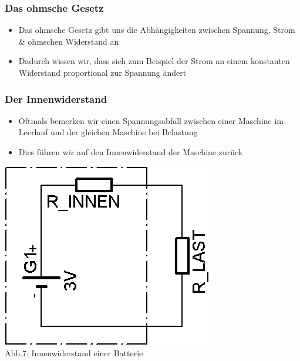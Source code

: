 \begin{frame}
  \frametitle{Das ohmsche Gesetz}
  \begin{itemize}
    \item	Das ohmsche Gesetz gibt uns die Abhängigkeiten zwischen Spannung, Strom \& ohmschen Widerstand an
    \item	Dadurch wissen wir, dass sich zum Beispiel der Strom an einem konstanten Widerstand proportional zur Spannung ändert
  \end{itemize}
\end{frame}

\begin{frame}
  \frametitle{Der Innenwiderstand}
  \begin{itemize}
    \item	Oftmals bemerken wir einen Spannungsabfall zwischen einer Maschine im Leerlauf und der gleichen Maschine bei Belastung
    \item	Dies führen wir auf den Innenwiderstand der Maschine zurück
  \end{itemize}
  \begin{center}
    \includegraphics[scale=1.4]{e03/Innenwiderstand.png}\\
    \small{Abb.7: Innenwiderstand einer Batterie}
  \end{center}
\end{frame}

